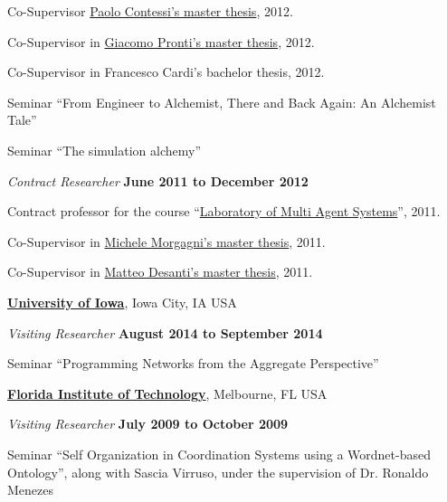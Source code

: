 \documentclass[10pt]{article}
\newenvironment{outerlist}[1][\enskip\textbullet]%
        {\begin{itemize}[#1]}{\end{itemize}%
         \vspace{-.6\baselineskip}}
\newenvironment{innerlist}[1][\enskip\textbullet]%
        {\begin{compactitem}[#1]}{\end{compactitem}}
\newcommand{\halfblankline}{\quad\vspace{-0.5\baselineskip}\pagebreak[3]}
\begin{document}
\begin{outerlist}
\begin{innerlist}
      \item Co-Supervisor \href{in http://apice.unibo.it/xwiki/bin/view/Theses/semanticwebsapere/}{Paolo Contessi's master thesis}, 2012.
      \item Co-Supervisor in \href{http://www.alice.unibo.it/xwiki/bin/view/Theses/ProntiAlchemistSapere/}{Giacomo Pronti's master thesis}, 2012.
      \item Co-Supervisor in Francesco Cardi's bachelor thesis, 2012.
      \item Seminar ``From Engineer to Alchemist, There and Back Again: An Alchemist Tale''
      \item Seminar ``The simulation alchemy''
    \end{innerlist}
\item[] \textit{Contract Researcher} \hfill \textbf{June 2011 to December 2012}
    \begin{innerlist}
      \item Contract professor for the course ``\href{http://apice.unibo.it/xwiki/bin/view/Courses/SmaLm1112Lab}{Laboratory of Multi Agent Systems}'', 2011.
      \item Co-Supervisor in \href{http://apice.unibo.it/xwiki/bin/view/Theses/SapereComm}{Michele Morgagni's master thesis}, 2011.
      \item Co-Supervisor in \href{http://www.alice.unibo.it/xwiki/bin/view/Theses/LSAspace}{Matteo Desanti's master thesis}, 2011.
    \end{innerlist}
\halfblankline
\end{outerlist}

\href{http://www.uiowa.edu/}{\textbf{University of Iowa}}, Iowa City, IA USA
\begin{outerlist}
 \item[] \textit{Visiting Researcher} \hfill \textbf{August 2014 to September 2014}
    \begin{innerlist}
      \item Seminar ``Programming Networks from the Aggregate Perspective''
    \end{innerlist}
\halfblankline
\end{outerlist}

\href{http://www.fit.edu/}{\textbf{Florida Institute of Technology}}, Melbourne, FL USA
\begin{outerlist}
 \item[] \textit{Visiting Researcher} \hfill \textbf{July 2009 to October 2009}
    \begin{innerlist}
      \item Seminar ``Self Organization in Coordination Systems using a Wordnet-based Ontology'', along with Sascia Virruso, under the supervision of Dr. Ronaldo Menezes
    \end{innerlist}
\halfblankline
\end{outerlist}
\end{document}
